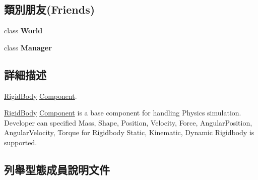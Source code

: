 \subsection*{類別朋友(Friends)}
\begin{DoxyCompactItemize}
\item 
class {\bfseries World}\hypertarget{class_magnum_1_1_physics3_1_1_rigid_body_a7b4bcdf992c21ae83363f25df05b1d25}{}\label{class_magnum_1_1_physics3_1_1_rigid_body_a7b4bcdf992c21ae83363f25df05b1d25}

\item 
class {\bfseries Manager}\hypertarget{class_magnum_1_1_physics3_1_1_rigid_body_adddd5c43ff870a047aa66db4edf82a7e}{}\label{class_magnum_1_1_physics3_1_1_rigid_body_adddd5c43ff870a047aa66db4edf82a7e}

\end{DoxyCompactItemize}


\subsection{詳細描述}
\hyperlink{class_magnum_1_1_physics3_1_1_rigid_body}{Rigid\+Body} \hyperlink{class_magnum_1_1_component}{Component}. 

\hyperlink{class_magnum_1_1_physics3_1_1_rigid_body}{Rigid\+Body} \hyperlink{class_magnum_1_1_component}{Component} is a base component for handling Physics simulation. Developer can specified Mass, Shape, Position, Velocity, Force, Angular\+Position, Angular\+Velocity, Torque for Rigidbody Static, Kinematic, Dynamic Rigidbody is supported. 

\subsection{列舉型態成員說明文件}
